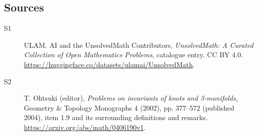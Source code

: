 \documentclass[11pt]{article}
\begin{document}
\subsection{Sources}
\begin{description}
\item[\hypertarget{source:statement:1}{S1}] ULAM. AI and the UnsolvedMath Contributors, \emph{UnsolvedMath: A Curated Collection of Open Mathematics Problems}, catalogue entry. CC BY 4.0. \url{https://huggingface.co/datasets/ulamai/UnsolvedMath}.
\item[\hypertarget{source:statement:2}{S2}] T. Ohtsuki (editor), \emph{Problems on invariants of knots and 3-manifolds}, Geometry \& Topology Monographs 4 (2002), pp. 377--572 (published 2004), item 1.9 and its surrounding definitions and remarks. \url{https://arxiv.org/abs/math/0406190v1}.
\end{description}
\label{end:statement}
\end{document}
